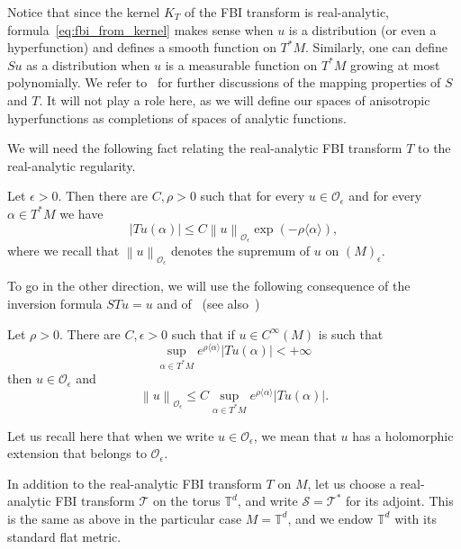 \documentclass[AHL,Unicode,longabstracts,published]{cedram}
\newcommand{\p}[1]{\left(#1\right)}
\newcommand{\n}[1]{\left\|#1\right\|}
\newcommand{\va}[1]{\left|#1\right|}
\newcommand{\brac}[1]{\langle #1 \rangle}
\newcommand{\clO}{\mathcal{O}}
\newcommand{\clT}{\mathcal{T}}
\newcommand{\clS}{\mathcal{S}}
\newcommand{\bbT}{\mathbb{T}}
\newcommand{\clO}{\mathcal{O}}
\begin{document}
Notice that since the kernel $K_T$ of the FBI transform is real-analytic, formula~\eqref{eq:fbi_from_kernel} makes sense when $u$ is a distribution (or even a hyperfunction) and defines a smooth function on $T^* M$. Similarly, one can define $Su$ as a distribution when $u$ is a measurable function on $T^* M$ growing at most polynomially. We refer to~\cite[\S~2.1]{BJ20} for further discussions of the mapping properties of $S$ and $T$. It will not play a role here, as we will define our spaces of anisotropic hyperfunctions as completions of spaces of analytic functions.

We will need the following fact relating the real-analytic FBI transform $T$ to the real-analytic regularity.

\begin{prop}[{\cite[Lemma~2.4]{BJ20}}]\label{proposition:decay_from_analytic}
Let $\epsilon > 0$. Then there are $C,\rho > 0$ such that for every $u \in \clO_\epsilon$ and for every $\alpha \in T^* M$ we have
\begin{equation*}
\va{Tu(\alpha)} \leq C \n{u}_{\clO_\epsilon} \exp\p{- \rho \brac{\alpha}},
\end{equation*}
where we recall that $\n{u}_{\clO_\epsilon}$ denotes the supremum of $u$ on $(M)_\epsilon$.
\end{prop}

To go in the other direction, we will use the following consequence of the inversion formula $STu = u$ and of~\cite[Lemma~2.6]{BJ20} (see also~\cite[Proposition~2.6]{BJ20})

\begin{prop}\label{proposition:analytic_from_decay}
Let $\rho > 0$. There are $C,\epsilon > 0$ such that if $u \in C^\infty(M)$ is such that
\begin{equation*}
\sup_{\alpha \in T^* M} e^{\rho \brac{\alpha}} \va{Tu(\alpha)} < + \infty
\end{equation*}
then $u \in \clO_\epsilon$ and
\begin{equation*}
\n{u}_{\clO_\epsilon} \leq C \sup_{\alpha \in T^* M} e^{\rho \brac{\alpha}} \va{Tu(\alpha)}.
\end{equation*}
\end{prop}

Let us recall here that when we write $u \in \clO_\epsilon$, we mean that $u$ has a holomorphic extension that belongs to $\clO_\epsilon$.

In addition to the real-analytic FBI transform $T$ on $M$, let us choose a real-analytic FBI transform $\clT$ on the torus $\bbT^d$, and write $\clS = \clT^*$ for its adjoint. This is the same as above in the particular case $M = \bbT^d$, and we endow $\bbT^d$ with its standard flat metric.
\end{document}
